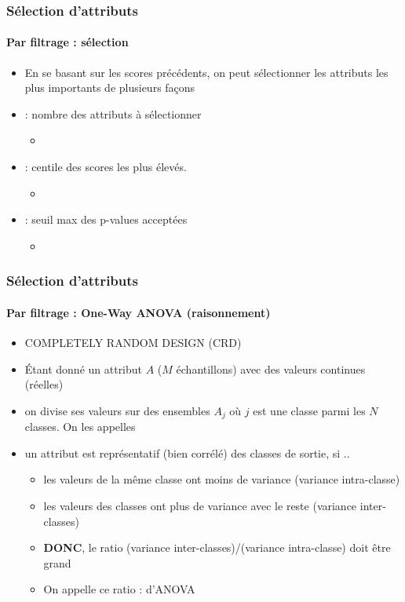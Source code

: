 \documentclass[xcolor=table]{beamer}
\begin{document}
\begin{frame}
	\frametitle{Sélection d'attributs}
	\framesubtitle{Par filtrage : sélection}
	
	\begin{itemize}
		\item En se basant sur les scores précédents, on peut sélectionner les attributs les plus importants de plusieurs façons
		\item {} : nombre des attributs à sélectionner
		\begin{itemize}
			\item {}
		\end{itemize}
		\item {} : centile des scores les plus élevés.
		\begin{itemize}
			\item {}
		\end{itemize}
		\item {} : seuil max des p-values acceptées
		\begin{itemize}
			\item {}
		\end{itemize}
	\end{itemize}
	
\end{frame}

\begin{frame}
	\frametitle{Sélection d'attributs}
	\framesubtitle{Par filtrage : One-Way ANOVA (raisonnement)}
	
	\begin{itemize}
		\item COMPLETELY RANDOM DESIGN (CRD) 
		\item Étant donné un attribut $A$ ($M$ échantillons) avec des valeurs continues (réelles)
		\item on divise ses valeurs sur des ensembles $A_j$ où $j$ est une classe parmi les $N$ classes. On les appelles 
		\item un attribut est représentatif (bien corrélé) des classes de sortie, si ..
		\begin{itemize}
			\item les valeurs de la même classe ont moins de variance (variance intra-classe)
			\item les valeurs des classes ont plus de variance avec le reste (variance inter-classes)
			\item \textbf{DONC}, le ratio (variance inter-classes)/(variance intra-classe) doit être grand
			\item On appelle ce ratio :  d'ANOVA
		\end{itemize}
	\end{itemize}
	
\end{frame}
\end{document}
